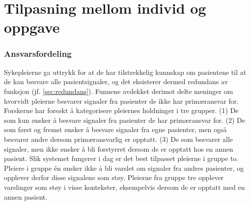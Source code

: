 \section{Tilpasning mellom individ og oppgave}

\subsubsection{Ansvarsfordeling}
Sykepleierne ga uttrykk for at de har tilstrekkelig kunnskap om pasientene til at de kan besvare alle pasientsignaler, og det eksisterer dermed redundans av funksjon (jf. \ref{sec:redundans}). Funnene avdekket derimot delte meninger om hvorvidt pleierne besvarer signaler fra pasienter de ikke har primæransvar for. Forskerne har forsøkt å kategorisere pleiernes holdninger i tre grupper. (1) De som kun ønsker å besvare signaler fra pasienter de har primæransvar for. (2) De som  først og fremst ønsker å besvare signaler fra egne pasienter, men også besvarer andre dersom primæransvarlig er opptatt. (3) De som besvarer alle signaler, men ikke ønsker å bli forstyrret dersom de er opptatt hos en annen pasient. Slik systemet fungerer i dag er det best tilpasset pleierne i gruppe to. Pleiere i gruppe én ønsker ikke å bli varslet om signaler fra andres pasienter, og opplever derfor disse signalene som støy. Pleierne fra gruppe tre opplever varslinger som støy i visse kontekster, eksempelvis dersom de er opptatt med en annen pasient.

